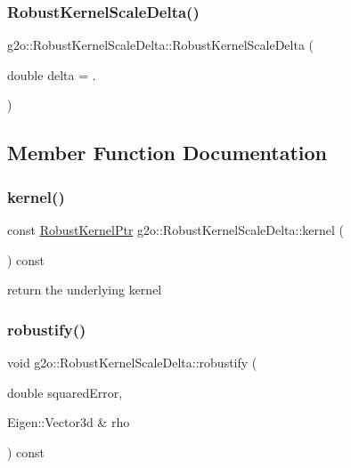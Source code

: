 \subsubsection{\texorpdfstring{Robust\+Kernel\+Scale\+Delta()}{RobustKernelScaleDelta()}\hspace{0.1cm}{\footnotesize\ttfamily [2/2]}}
{\footnotesize\ttfamily g2o\+::\+Robust\+Kernel\+Scale\+Delta\+::\+Robust\+Kernel\+Scale\+Delta (\begin{DoxyParamCaption}\item[{double}]{delta = {.} }\end{DoxyParamCaption})\hspace{0.3cm}{\ttfamily [explicit]}}



\subsection{Member Function Documentation}
\mbox{\label{classg2o_1_1_robust_kernel_scale_delta_a0d7d1119654f6e604609bb5b62e79cf2}} 
\subsubsection{\texorpdfstring{kernel()}{kernel()}}
{\footnotesize\ttfamily const \mbox{\hyperlink{namespaceg2o_a0802a5e01a6b1861ae01013220dec6ac}{Robust\+Kernel\+Ptr}} g2o\+::\+Robust\+Kernel\+Scale\+Delta\+::kernel (\begin{DoxyParamCaption}{ }\end{DoxyParamCaption}) const\hspace{0.3cm}{\ttfamily [inline]}}



return the underlying kernel 

\mbox{\label{classg2o_1_1_robust_kernel_scale_delta_a97376c3ba35370fa551e899fd5391a2f}} 
\subsubsection{\texorpdfstring{robustify()}{robustify()}}
{\footnotesize\ttfamily void g2o\+::\+Robust\+Kernel\+Scale\+Delta\+::robustify (\begin{DoxyParamCaption}\item[{double}]{squared\+Error,  }\item[{Eigen\+::\+Vector3d \&}]{rho }\end{DoxyParamCaption}) const\hspace{0.3cm}{\ttfamily [virtual]}}

